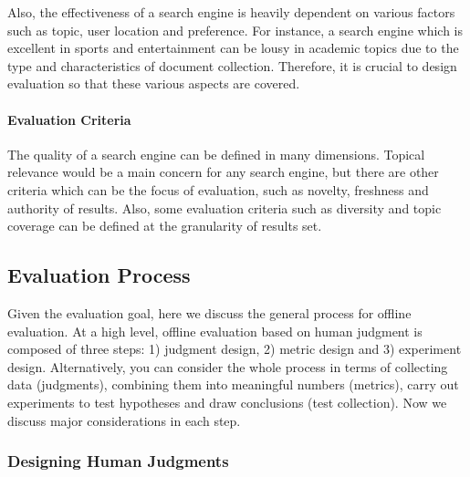 Also, the effectiveness of a search engine is heavily dependent on various factors such as topic, user location and preference. For instance, a search engine which is excellent in sports and entertainment can be lousy in academic topics due to the type and characteristics of document collection. Therefore, it is crucial to design evaluation so that these various aspects are covered. 

\paragraph{Evaluation Criteria}
The quality of a search engine can be defined in many dimensions. Topical relevance would be a main concern for any search engine, but there are other criteria which can be the focus of evaluation, such as novelty, freshness and authority of results. Also, some evaluation criteria such as diversity and topic coverage can be defined at the granularity of results set.

\subsection{Evaluation Process}
Given the evaluation goal, here we discuss the general process for offline evaluation. At a high level, offline evaluation based on human judgment is composed of three steps: 1) judgment design, 2) metric design and 3) experiment design. Alternatively, you can consider the whole process in terms of collecting data (judgments), combining them into meaningful numbers (metrics), carry out experiments to test hypotheses and draw conclusions (test collection). Now we discuss major considerations in each step.


\subsubsection{Designing Human Judgments}

